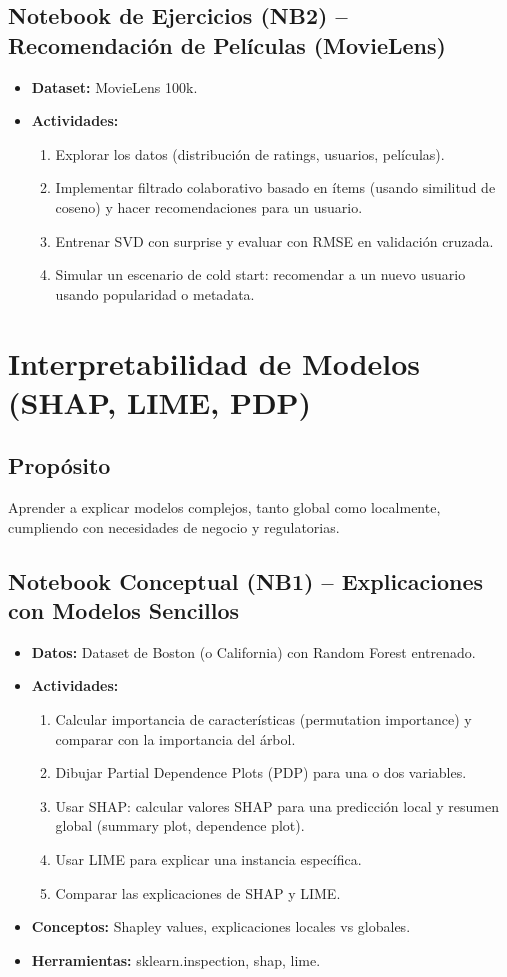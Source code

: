 \documentclass[12pt,a4paper]{article}
\begin{document}
\subsection*{Notebook de Ejercicios (NB2) – Recomendación de Películas (MovieLens)}
\begin{itemize}
    \item \textbf{Dataset:} MovieLens 100k.
    \item \textbf{Actividades:}
    \begin{enumerate}
        \item Explorar los datos (distribución de ratings, usuarios, películas).
        \item Implementar filtrado colaborativo basado en ítems (usando similitud de coseno) y hacer recomendaciones para un usuario.
        \item Entrenar SVD con surprise y evaluar con RMSE en validación cruzada.
        \item Simular un escenario de cold start: recomendar a un nuevo usuario usando popularidad o metadata.
    \end{enumerate}
\end{itemize}

\section{Interpretabilidad de Modelos (SHAP, LIME, PDP)}
\subsection*{Propósito}
Aprender a explicar modelos complejos, tanto global como localmente, cumpliendo con necesidades de negocio y regulatorias.

\subsection*{Notebook Conceptual (NB1) – Explicaciones con Modelos Sencillos}
\begin{itemize}
    \item \textbf{Datos:} Dataset de Boston (o California) con Random Forest entrenado.
    \item \textbf{Actividades:}
    \begin{enumerate}
        \item Calcular importancia de características (permutation importance) y comparar con la importancia del árbol.
        \item Dibujar Partial Dependence Plots (PDP) para una o dos variables.
        \item Usar SHAP: calcular valores SHAP para una predicción local y resumen global (summary plot, dependence plot).
        \item Usar LIME para explicar una instancia específica.
        \item Comparar las explicaciones de SHAP y LIME.
    \end{enumerate}
    \item \textbf{Conceptos:} Shapley values, explicaciones locales vs globales.
    \item \textbf{Herramientas:} sklearn.inspection, shap, lime.
\end{itemize}
\end{document}
